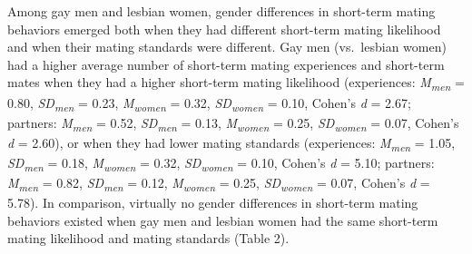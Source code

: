 \documentclass[
  11pt,
]{article}
\begin{document}
Among gay men and lesbian women, gender differences in short-term mating
behaviors emerged both when they had different short-term mating
likelihood and when their mating standards were different. Gay men
(vs.~lesbian women) had a higher average number of short-term mating
experiences and short-term mates when they had a higher short-term
mating likelihood (experiences: \emph{M\textsubscript{men}} = 0.80,
\emph{SD\textsubscript{men}} = 0.23, \emph{M\textsubscript{women}} =
0.32, \emph{SD\textsubscript{women}} = 0.10, Cohen's \emph{d} = 2.67;
partners: \emph{M\textsubscript{men}} = 0.52,
\emph{SD\textsubscript{men}} = 0.13, \emph{M\textsubscript{women}} =
0.25, \emph{SD\textsubscript{women}} = 0.07, Cohen's \emph{d} = 2.60),
or when they had lower mating standards (experiences:
\emph{M\textsubscript{men}} = 1.05, \emph{SD\textsubscript{men}} = 0.18,
\emph{M\textsubscript{women}} = 0.32, \emph{SD\textsubscript{women}} =
0.10, Cohen's \emph{d} = 5.10; partners: \emph{M\textsubscript{men}} =
0.82, \emph{SD\textsubscript{men}} = 0.12, \emph{M\textsubscript{women}}
= 0.25, \emph{SD\textsubscript{women}} = 0.07, Cohen's \emph{d} = 5.78).
In comparison, virtually no gender differences in short-term mating
behaviors existed when gay men and lesbian women had the same short-term
mating likelihood and mating standards (Table 2).
\end{document}
